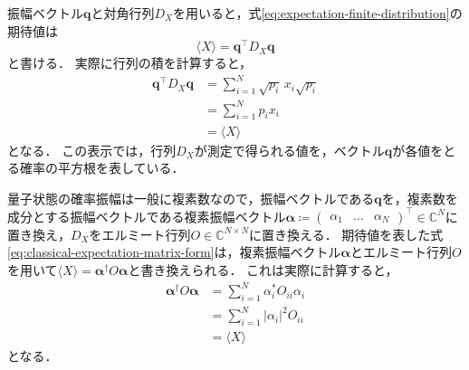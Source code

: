 振幅ベクトル$\bm{q}$と対角行列$D_X$を用いると，式\eqref{eq:expectation-finite-distribution}の期待値は
\begin{equation}
  \langle X\rangle=\bm{q}^\top D_X \bm{q}
  \label{eq:classical-expectation-matrix-form}
\end{equation}
と書ける．
実際に行列の積を計算すると，
\begin{equation*}
  \begin{aligned}
    \bm{q}^\top D_X \bm{q}
    &=\sum_{i=1}^{N}\sqrt{p_i}\,x_i\sqrt{p_i}\\
    &=\sum_{i=1}^{N}p_i x_i\\
    &=\langle X\rangle
  \end{aligned}
\end{equation*}
となる．
この表示では，行列$D_X$が測定で得られる値を，ベクトル$\bm{q}$が各値をとる確率の平方根を表している．

量子状態の確率振幅は一般に複素数なので，振幅ベクトルである$\bm{q}$を，複素数を成分とする振幅ベクトルである複素振幅ベクトル$\bm{\alpha} \coloneq \begin{pmatrix} \alpha_1 & \ldots & \alpha_N \end{pmatrix}^\top \in \mathbb{C}^N$に置き換え，$D_X$をエルミート行列$O\in \mathbb{C}^{N\times N}$に置き換える．
期待値を表した式\eqref{eq:classical-expectation-matrix-form}は，複素振幅ベクトル$\bm{\alpha}$とエルミート行列$O$を用いて$\langle X\rangle = \bm{\alpha}^{\dagger} O \bm{\alpha}$と書き換えられる．
これは実際に計算すると，
\begin{equation*}
  \begin{aligned}
    \bm{\alpha}^{\dagger} O \bm{\alpha}
    &= \sum_{i=1}^{N} \alpha_i^* O_{ii} \alpha_i \\
    &= \sum_{i=1}^{N} |\alpha_i|^2 O_{ii} \\
    &= \langle X\rangle
  \end{aligned}
\end{equation*}
となる．



